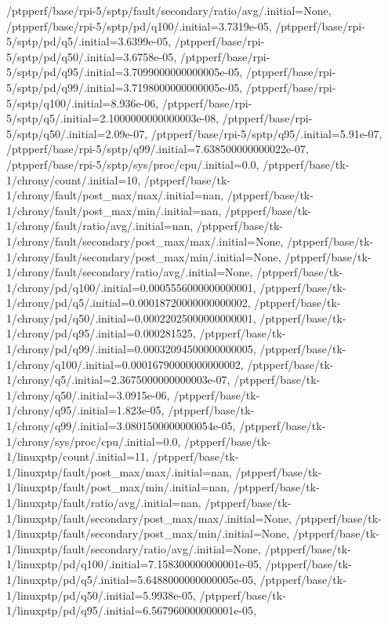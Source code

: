 {    /ptpperf/base/rpi-5/sptp/fault/secondary/ratio/avg/.initial=None,
    /ptpperf/base/rpi-5/sptp/pd/q100/.initial=3.7319e-05,
    /ptpperf/base/rpi-5/sptp/pd/q5/.initial=3.6399e-05,
    /ptpperf/base/rpi-5/sptp/pd/q50/.initial=3.6758e-05,
    /ptpperf/base/rpi-5/sptp/pd/q95/.initial=3.7099000000000005e-05,
    /ptpperf/base/rpi-5/sptp/pd/q99/.initial=3.7198000000000005e-05,
    /ptpperf/base/rpi-5/sptp/q100/.initial=8.936e-06,
    /ptpperf/base/rpi-5/sptp/q5/.initial=2.1000000000000003e-08,
    /ptpperf/base/rpi-5/sptp/q50/.initial=2.09e-07,
    /ptpperf/base/rpi-5/sptp/q95/.initial=5.91e-07,
    /ptpperf/base/rpi-5/sptp/q99/.initial=7.638500000000022e-07,
    /ptpperf/base/rpi-5/sptp/sys/proc/cpu/.initial=0.0,
    /ptpperf/base/tk-1/chrony/count/.initial=10,
    /ptpperf/base/tk-1/chrony/fault/post_max/max/.initial=nan,
    /ptpperf/base/tk-1/chrony/fault/post_max/min/.initial=nan,
    /ptpperf/base/tk-1/chrony/fault/ratio/avg/.initial=nan,
    /ptpperf/base/tk-1/chrony/fault/secondary/post_max/max/.initial=None,
    /ptpperf/base/tk-1/chrony/fault/secondary/post_max/min/.initial=None,
    /ptpperf/base/tk-1/chrony/fault/secondary/ratio/avg/.initial=None,
    /ptpperf/base/tk-1/chrony/pd/q100/.initial=0.0005556000000000001,
    /ptpperf/base/tk-1/chrony/pd/q5/.initial=0.00018720000000000002,
    /ptpperf/base/tk-1/chrony/pd/q50/.initial=0.00022025000000000001,
    /ptpperf/base/tk-1/chrony/pd/q95/.initial=0.000281525,
    /ptpperf/base/tk-1/chrony/pd/q99/.initial=0.00032094500000000005,
    /ptpperf/base/tk-1/chrony/q100/.initial=0.00016790000000000002,
    /ptpperf/base/tk-1/chrony/q5/.initial=2.3675000000000003e-07,
    /ptpperf/base/tk-1/chrony/q50/.initial=3.0915e-06,
    /ptpperf/base/tk-1/chrony/q95/.initial=1.823e-05,
    /ptpperf/base/tk-1/chrony/q99/.initial=3.0801500000000054e-05,
    /ptpperf/base/tk-1/chrony/sys/proc/cpu/.initial=0.0,
    /ptpperf/base/tk-1/linuxptp/count/.initial=11,
    /ptpperf/base/tk-1/linuxptp/fault/post_max/max/.initial=nan,
    /ptpperf/base/tk-1/linuxptp/fault/post_max/min/.initial=nan,
    /ptpperf/base/tk-1/linuxptp/fault/ratio/avg/.initial=nan,
    /ptpperf/base/tk-1/linuxptp/fault/secondary/post_max/max/.initial=None,
    /ptpperf/base/tk-1/linuxptp/fault/secondary/post_max/min/.initial=None,
    /ptpperf/base/tk-1/linuxptp/fault/secondary/ratio/avg/.initial=None,
    /ptpperf/base/tk-1/linuxptp/pd/q100/.initial=7.158300000000001e-05,
    /ptpperf/base/tk-1/linuxptp/pd/q5/.initial=5.6488000000000005e-05,
    /ptpperf/base/tk-1/linuxptp/pd/q50/.initial=5.9938e-05,
    /ptpperf/base/tk-1/linuxptp/pd/q95/.initial=6.567960000000001e-05,
}
